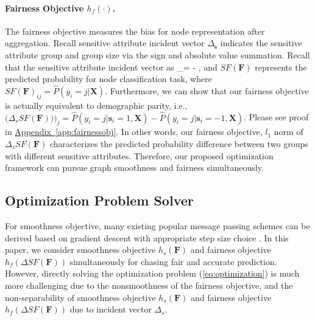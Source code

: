 \documentclass[letterpaper]{article} %
\theoremstyle{plain}
\theoremstyle{definition}
\theoremstyle{remark}
\begin{document}
\paragraph{Fairness Objective $h_f(\cdot)$.} The fairness objective measures the bias for node representation after aggregation. Recall sensitive attribute incident vector $\Delta_{\mathbf{s}}$ indicates the sensitive attribute group and group size via the sign and absolute value summation. Recall that the sensitive attribute incident vector as 
\be 
\Delta_{}=  - ,
\ee 
and $SF(\mathbf{F})$ represents the predicted probability for node classification task, where $SF(\mathbf{F})_{ij}=\hat{P}(y_i=j|\mathbf{X})$. Furthermore, we can show that our fairness objective is actually equivalent to demographic parity, i.e., $\Big(\Delta_s SF(\mathbf{F})\big)\Big)_j=\hat{P}(y_i=j|\mathbf{s}_i=1, \mathbf{X}) - \hat{P}(y_i=j|\mathbf{s}_i=-1, \mathbf{X})$. Please see proof in \underline{Appendix~\ref{app:fairnessobj}}.
In other words, our fairness objective, $l_1$ norm of $\Delta_s SF(\mathbf{F})$ characterizes the predicted probability difference between two groups with different sensitive attributes. Therefore, our proposed optimization framework can pursue graph smoothness and fairness simultaneously.

\subsection{Optimization Problem Solver}
For smoothness objective, many existing popular message passing schemes can be derived based on gradient descent with appropriate step size choice \citep{ma2021unified,zhu2021interpreting}. In this paper, we consider smoothness objective $h_s(\mathbf{F})$ and fairness objective $h_f(\Delta SF(\mathbf{F}))$ simultaneously for chasing fair and accurate prediction. However, directly solving the optimization problem (\ref{eq:optimization}) is much more challenging due to the nonsmoothness of the fairness objective, and the non-separability of smoothness objective $h_s(\mathbf{F})$ and fairness objective $h_f(\Delta SF(\mathbf{F}))$ due to incident vector $\Delta_s$. 
\end{document}
